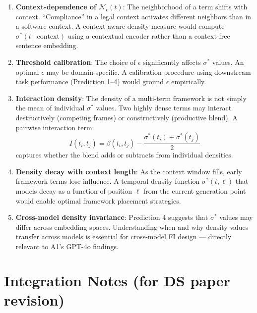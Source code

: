 \documentclass[11pt,a4paper]{article}
\begin{document}
\begin{enumerate}

  \item \textbf{Context-dependence of $\mathcal{N}_\epsilon(t)$}: The
    neighborhood of a term shifts with context. ``Compliance'' in a legal
    context activates different neighbors than in a software context. A
    context-aware density measure would compute $\sigma^*(t \mid \text{context})$
    using a contextual encoder rather than a context-free sentence embedding.

  \item \textbf{Threshold calibration}: The choice of $\epsilon$ significantly
    affects $\sigma^*$ values. An optimal $\epsilon$ may be domain-specific.
    A calibration procedure using downstream task performance (Prediction 1--4)
    would ground $\epsilon$ empirically.

  \item \textbf{Interaction density}: The density of a multi-term framework is
    not simply the mean of individual $\sigma^*$ values. Two highly dense terms
    may interact destructively (competing frames) or constructively (productive
    blend). A pairwise interaction term:
    \[
      I(t_i, t_j) = \beta(t_i, t_j) - \frac{\sigma^*(t_i) + \sigma^*(t_j)}{2}
    \]
    captures whether the blend adds or subtracts from individual densities.

  \item \textbf{Density decay with context length}: As the context window fills,
    early framework terms lose influence. A temporal density function
    $\sigma^*(t, \ell)$ that models decay as a function of position $\ell$
    from the current generation point would enable optimal framework placement
    strategies.

  \item \textbf{Cross-model density invariance}: Prediction 4 suggests that
    $\sigma^*$ values may differ across embedding spaces. Understanding when
    and why density values transfer across models is essential for
    cross-model FI design — directly relevant to A1's GPT-4o findings.

\end{enumerate}

\section*{Integration Notes (for DS paper revision)}
\end{document}
